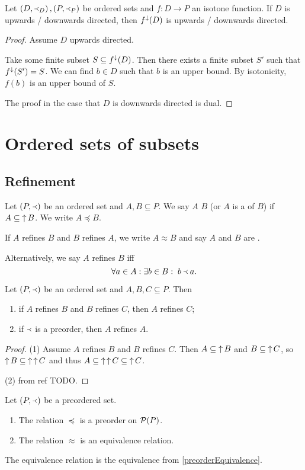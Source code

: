 \begin{proposition} \label{imageDirectedSet}
Let $\left( D,\Yleft_D \right), \left( P,\Yleft_P \right)$ be ordered sets and $f: D\to P$ an isotone function. If $D$ is upwards / downwards directed, then $f^{\downarrow}(D)$ is upwards / downwards directed.
\end{proposition}
\begin{proof}
Assume $D$ upwards directed.

Take some finite subset $S\subseteq f^\downarrow(D)$. Then there exists a finite subset $S'$ such that $f^\downarrow(S') = S$. We can find $b\in D$ such that $b$ is an upper bound. By isotonicity, $f(b)$ is an upper bound of $S$.

The proof in the case that $D$ is downwards directed is dual.
\end{proof}

\section{Ordered sets of subsets}
\subsection{Refinement}
\begin{definition}
Let $\left( P,\Yleft \right)$ be an ordered set and $A,B \subseteq P$. We say $A$  $B$ (or $A$ is a  of $B$) if $A\subseteq \operatorname{\uparrow} B$. We write $A \preceq B$.

If $A$ refines $B$ and $B$ refines $A$, we write $A \approx B$ and say $A$ and $B$ are .
\end{definition}

Alternatively, we say $A$ refines $B$ iff
\[ \forall a\in A: \exists b\in B: \; b \Yleft a. \]

\begin{lemma}
Let $\left( P,\Yleft \right)$ be an ordered set and $A,B,C \subseteq P$. Then
\begin{enumerate}
\item if $A$ refines $B$ and $B$ refines $C$, then $A$ refines $C$;
\item if $\Yleft$ is a preorder, then $A$ refines $A$.
\end{enumerate}
\end{lemma}
\begin{proof}
(1) Assume $A$ refines $B$ and $B$ refines $C$. Then $A \subseteq \operatorname{\uparrow} B$ and $B\subseteq \operatorname{\uparrow} C$, so $\operatorname{\uparrow} B \subseteq \operatorname{\uparrow}\operatorname{\uparrow} C$ and thus $A \subseteq \operatorname{\uparrow}\operatorname{\uparrow} C \subseteq \operatorname{\uparrow} C$.

(2) from  ref TODO.
\end{proof}
\begin{corollary}
Let $\left( P,\Yleft \right)$ be a preordered set.
\begin{enumerate}
\item The relation $\preceq$ is a preorder on $\operatorname{\mathcal{P}}(P)$.
\item The relation $\approx$ is an equivalence relation.
\end{enumerate}
\end{corollary}
The equivalence relation is the equivalence from \ref{preorderEquivalence}.

